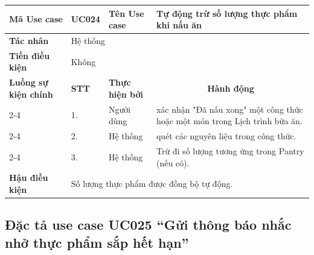 \documentclass[../main.tex]{subfiles}
\begin{document}
\begin{longtable}{|p{2.7cm}|p{0.8cm}|p{2.6cm}|p{7.3cm}|}
\hline
\cellcolor[HTML]{D5F5E3}\textbf{Mã Use case} & \multicolumn{1}{l|}{UC024} & \cellcolor[HTML]{D5F5E3}\textbf{Tên Use case} & Tự động trừ số lượng thực phẩm khi nấu ăn \\ \hline
\cellcolor[HTML]{D5F5E3}\textbf{Tác nhân} & \multicolumn{3}{p{10.7cm}|}{Hệ thống} \\ \hline
\cellcolor[HTML]{D5F5E3}\textbf{Tiền điều kiện} & \multicolumn{3}{p{10.7cm}|}{Không} \\ \hline

\cellcolor[HTML]{D5F5E3}\textbf{Luồng sự kiện chính} & \cellcolor[HTML]{FDEBD0}\textbf{STT} & \cellcolor[HTML]{FDEBD0}\textbf{Thực hiện bởi} & \multicolumn{1}{c|}{\cellcolor[HTML]{FDEBD0}\textbf{Hành động}} \\ \cline{2-4} 
\cellcolor[HTML]{D5F5E3} & 1. & Người dùng & xác nhận "Đã nấu xong" một công thức hoặc một món trong Lịch trình bữa ăn. \\ \cline{2-4} 
\cellcolor[HTML]{D5F5E3} & 2. & Hệ thống & quét các nguyên liệu trong công thức. \\ \cline{2-4} 
\cellcolor[HTML]{D5F5E3} & 3. & Hệ thống & Trừ đi số lượng tương ứng trong Pantry (nếu có). \\ \hline

\cellcolor[HTML]{D5F5E3}\textbf{Hậu điều kiện} & \multicolumn{3}{p{10.7cm}|}{Số lượng thực phẩm được đồng bộ tự động.} \\ \hline
\end{longtable}
\endgroup

\subsection{Đặc tả use case UC025 ``Gửi thông báo nhắc nhở thực phẩm sắp hết hạn''}
\vspace{0.5cm}

\begingroup
\renewcommand{\arraystretch}{1.5}
\end{document}
